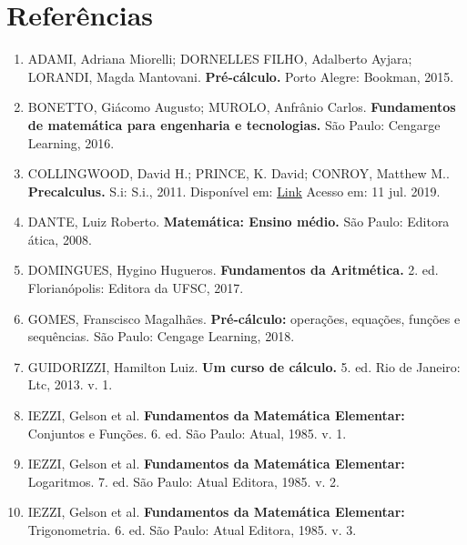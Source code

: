 \chapter*{Referências}

 \begin{enumerate}[1.]
 
 \item ADAMI, Adriana Miorelli; DORNELLES FILHO, Adalberto Ayjara; LORANDI, Magda Mantovani. \textbf{Pré-cálculo.} Porto Alegre: Bookman, 2015.
 
 \item BONETTO, Giácomo Augusto; MUROLO, Anfrânio Carlos. \textbf{Fundamentos de matemática para engenharia e tecnologias.} São Paulo: Cengarge Learning, 2016.
 
 \item COLLINGWOOD, David H.; PRINCE, K. David; CONROY, Matthew M.. \textbf{Precalculus.} S.i: S.i., 2011. Disponível em: \href{https://sites.math.washington.edu/~colling/HSMath120/TB201112.pdf}{Link} Acesso em: 11 jul. 2019.
 
 \item DANTE, Luiz Roberto. \textbf{Matemática: Ensino médio.} São Paulo: Editora ática, 2008.
 
 \item DOMINGUES, Hygino Hugueros. \textbf{Fundamentos da Aritmética.} 2. ed. Florianópolis: Editora da UFSC, 2017.

  \item  GOMES, Franscisco Magalhães. \textbf{Pré-cálculo:} operações, equações, funções e sequências. São Paulo: Cengage Learning, 2018.
 
  \item GUIDORIZZI, Hamilton Luiz. \textbf{Um curso de cálculo.} 5. ed. Rio de Janeiro: Ltc, 2013. v. 1.
  
   \item IEZZI, Gelson et al. \textbf{Fundamentos da Matemática Elementar:} Conjuntos e Funções. 6. ed. São Paulo: Atual, 1985. v. 1.
   
   \item IEZZI, Gelson et al. \textbf{Fundamentos da Matemática Elementar:} Logaritmos. 7. ed. São Paulo: Atual Editora, 1985. v. 2.
   
   \item IEZZI, Gelson et al. \textbf{Fundamentos da Matemática Elementar:} Trigonometria. 6. ed. São Paulo: Atual Editora, 1985. v. 3.
   

\end{enumerate}
